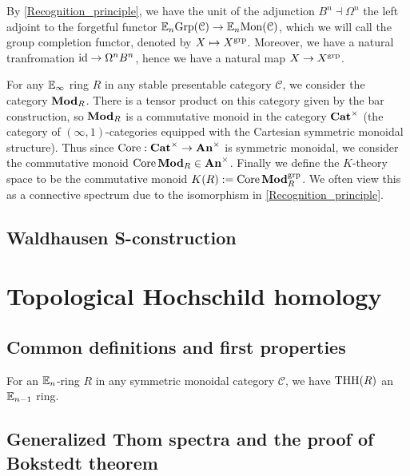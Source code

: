 	\begin{const}\label{Group_completion}
		By \cref{Recognition_principle}, we have the unit of the adjunction $B^n\dashv\Omega^n$ the left adjoint to the forgetful functor $\mathbb{E}_n\mathrm{Grp}(\mathcal{C})\to\mathbb{E}_n\mathrm{Mon}(\mathcal{C})$, which we will call the group completion functor, denoted by $X\mapsto X^{\operatorname{\mathrm{grp}}}$. Moreover, we have a natural tranfromation $\operatorname{\mathrm{id}}\to\Omega^nB^n$, hence we have a natural map $X\to X^{\operatorname{\mathrm{grp}}}$. 
	\end{const}

	\begin{defn}\label{Algebraic_K_theory}
		For any $\mathbb{E}_\infty$ ring $R$ in any stable presentable category $\mathcal{C}$, we consider the category $\mathbf{Mod}_R$. There is a tensor product on this category given by the bar construction, so $\mathbf{Mod}_R$ is a commutative monoid in the category $\mathbf{Cat}^\times$ (the category of $(\infty,1)$-categories equipped with the Cartesian symmetric monoidal structure). Thus since $\operatorname{\mathrm{Core}}:\mathbf{Cat}^\times\to\mathbf{An}^\times$ is symmetric monoidal, we consider the commutative monoid $\operatorname{\mathrm{Core}}\mathbf{Mod}_R\in\mathbf{An}^\times$. Finally we define the $K$-theory space to be the commutative monoid $K(R):=\operatorname{\mathrm{Core}}\mathbf{Mod}_R^{\operatorname{\mathrm{grp}}}$. We often view this as a connective spectrum due to the isomorphism in \cref{Recognition_principle}. 
	\end{defn}

\section{Waldhausen S-construction}

\chapter{Topological Hochschild homology}

\section{Common definitions and first properties}

	\begin{thm}\label{THH_comm_1}
		For an $\mathbb{E}_n$-ring $R$ in any symmetric monoidal category $\mathcal{C}$, we have $\operatorname{\mathrm{THH}}(R)$ an $\mathbb{E}_{n-1}$ ring. 
	\end{thm}

\section{Generalized Thom spectra and the proof of Bokstedt theorem}

